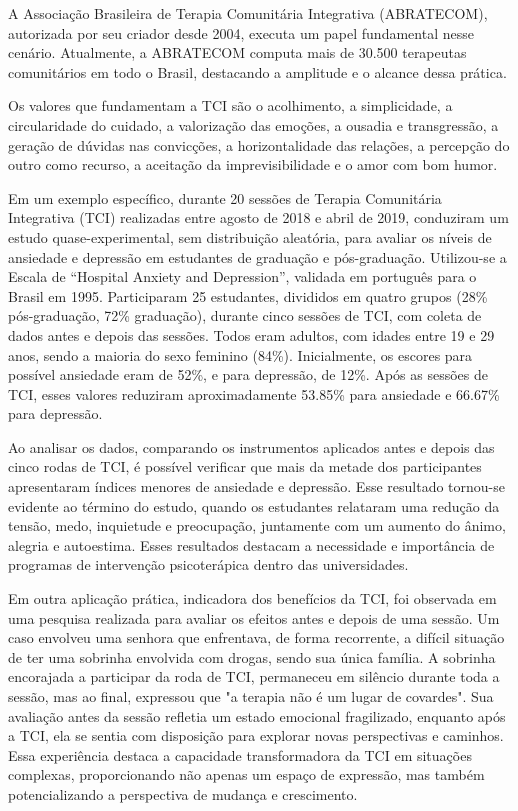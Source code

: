A Associação Brasileira de Terapia Comunitária Integrativa (ABRATECOM), autorizada por seu criador desde 2004, executa um papel fundamental nesse cenário. Atualmente, a ABRATECOM computa mais de 30.500 terapeutas comunitários em todo o Brasil, destacando a amplitude e o alcance dessa prática.\cite{SILVAFRANCO}

\newpage
Os valores que fundamentam a TCI são o acolhimento, a simplicidade, a circularidade do cuidado, a valorização das emoções, a ousadia e transgressão, a geração de dúvidas nas convicções, a horizontalidade das relações, a percepção do outro como recurso, a aceitação da imprevisibilidade e o amor com bom humor.\cite{SILVA}

Em um exemplo específico, durante 20 sessões de Terapia Comunitária Integrativa (TCI) realizadas entre agosto de 2018 e abril de 2019, \cite{BOARETTO} conduziram um estudo quase-experimental, sem distribuição aleatória, para avaliar os níveis de ansiedade e depressão em estudantes de graduação e pós-graduação. Utilizou-se a Escala de “Hospital Anxiety and Depression”, validada em português para o Brasil em 1995. Participaram 25 estudantes, divididos em quatro grupos (28\% pós-graduação, 72\% graduação), durante cinco sessões de TCI, com coleta de dados antes e depois das sessões. Todos eram adultos, com idades entre 19 e 29 anos, sendo a maioria do sexo feminino (84\%). Inicialmente, os escores para possível ansiedade eram de 52\%, e para depressão, de 12\%. Após as sessões de TCI, esses valores reduziram aproximadamente 53.85\% para ansiedade e 66.67\% para depressão.

Ao analisar os dados, comparando os instrumentos aplicados antes e depois das cinco rodas de TCI, é possível verificar que mais da metade dos participantes apresentaram índices menores de ansiedade e depressão. Esse resultado tornou-se evidente ao término do estudo, quando os estudantes relataram uma redução da tensão, medo, inquietude e preocupação, juntamente com um aumento do ânimo, alegria e autoestima. Esses resultados destacam a necessidade e importância de programas de intervenção psicoterápica dentro das universidades.\cite{BOARETTO}

Em outra aplicação prática, indicadora dos benefícios da TCI, foi observada em uma pesquisa realizada para avaliar os efeitos antes e depois de uma sessão. Um caso envolveu uma senhora que enfrentava, de forma recorrente, a difícil situação de ter uma sobrinha envolvida com drogas, sendo sua única família. A sobrinha encorajada a participar da roda de TCI, permaneceu em silêncio durante toda a sessão, mas ao final, expressou que "a terapia não é um lugar de covardes". Sua avaliação antes da sessão refletia um estado emocional fragilizado, enquanto após a TCI, ela se sentia com disposição para explorar novas perspectivas e caminhos. Essa experiência destaca a capacidade transformadora da TCI em situações complexas, proporcionando não apenas um espaço de expressão, mas também potencializando a perspectiva de mudança e crescimento. \cite{LEITEePALOS}




